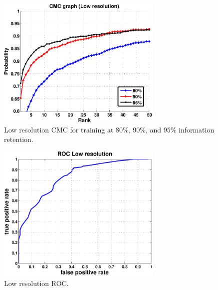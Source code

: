 ~\vfill

\vfill

~\vfill

\begin{figure}[hbt]
  \centering
  \includegraphics[width=0.7\textwidth]{../results/Output_L.pdf}
  \caption{Low resolution CMC for training at 80\%, 90\%, and 95\% information retention.}
  \label{fig:cmc_l}
\end{figure}

\begin{figure}[hbt]
  \centering
  \includegraphics[width=0.7\textwidth]{../results/ROC_L.pdf}
  \caption{Low resolution ROC.}
  \label{fig:roc_l}
\end{figure}

\clearpage

~\vfill

